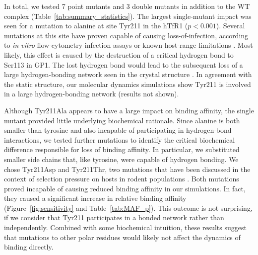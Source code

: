 \documentclass[12pt]{article}
\begin{document}
In total, we tested 7 point mutants and 3 double mutants in addition to the WT complex (Table~\ref{tab:summary_statistics}). The largest single-mutant impact was seen for a mutation to alanine at site Tyr211 in the hTfR1 ($ p < 0.001 $).  Several mutations at this site have proven capable of causing loss-of-infection, according to \textit{in vitro} flow-cytometry infection assays or known host-range limitations \citep{Rad2008,Rad20111,Rad20112}. Most likely, this effect is caused by the destruction of a critical hydrogen bond to Ser113 in GP1. The lost hydrogen bond would lead to the subsequent loss of a large hydrogen-bonding network seen in the crystal structure \citep{Abraham2010}. In agreement with the static structure, our molecular dynamics simulations show Tyr211 is involved in a large hydrogen-bonding network (results not shown). 

Although Tyr211Ala appears to have a large impact on binding affinity, the single mutant provided little underlying biochemical rationale. Since alanine is both smaller than tyrosine and also incapable of participating in hydrogen-bond interactions, we tested further mutations to identify the critical biochemical difference responsible for loss of binding affinity. In particular, we substituted smaller side chains that, like tyrosine, were capable of hydrogen bonding. We chose Tyr211Asp and Tyr211Thr, two mutations that have been discussed in the context of selection pressure on hosts in rodent populations \citep{Rad2008,Rad20111,Rad20112}. Both mutations proved incapable of causing reduced binding affinity in our simulations. In fact, they caused a significant increase in relative binding affinity (Figure~\ref{fig:sensitivity} and Table~\ref{tab:MAF_p}). This outcome is not surprising, if we consider that Tyr211 participates in a bonded network rather than independently. Combined with some biochemical intuition, these results suggest that mutations to other polar residues would likely not affect the dynamics of binding directly.
\end{document}
